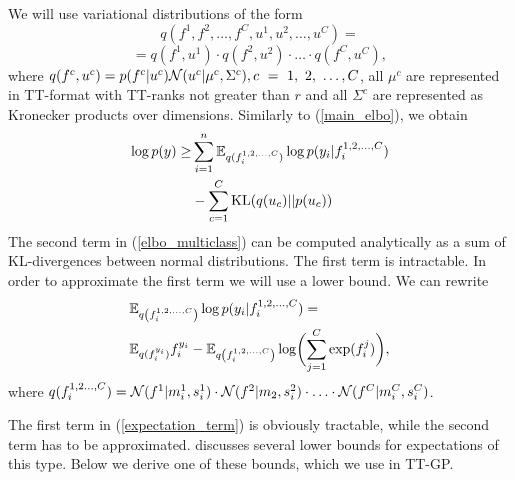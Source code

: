  We will use variational distributions of the form
  \[
    q(f^1, f^2, \ldots, f^C, u^1, u^2, \ldots, u^C) =
  \]
  \[
    = q(f^1, u^1) \cdot q(f^2, u^2) \cdot \ldots \cdot q(f^C, u^C),
  \]
  where $q(f^c, u^c) = p(f^c | u^c) \mathcal{N}(u^c | \mu^c, \Sigma^c), c~=~1,~2,~\ldots,\\C$,
  all $\mu^c$ are represented in TT-format with TT-ranks not greater than $r$
  and all  $\Sigma^c$ are represented as Kronecker products over dimensions. 
  Similarly to (\ref{main_elbo}), we obtain
  \begin{equation}
  \label{elbo_multiclass}
  \begin{split}
    \log p(y) \ge & \sum_{i = 1}^n \mathbb{E}_{q(f_i^{1, 2, \ldots, C})} \log p(y_i | f_i^{1, 2, \ldots, C})
    \\
    & - \sum_{c = 1}^{C} \mbox{KL}(q(u_c) || p(u_c))
  \end{split}
  \end{equation}
  The second term in (\ref{elbo_multiclass}) can be computed analytically as
  a sum of KL-divergences between normal distributions. The first term is
  intractable. In order to approximate the first term we will use a lower bound.
  We can rewrite
  \begin{equation}
  \label{expectation_term}
  \begin{split}
    &\mathbb{E}_{q\left(f_i^{1, 2, \ldots, C}\right)} \log p(y_i | f_i^{1, 2, \ldots, C}) =\\
    &\mathbb{E}_{q(f_i^{y_i})} f_i^{y_i} - \mathbb{E}_{q\left(f_i^{1, 2, \ldots, C}\right)}
    \log \biggl(\sum_{j=1}^C \exp (f_i^j) \biggr),
  \end{split}
  \end{equation}
  where $q(f_i^{1, 2\ldots, C}) = \mathcal{N}(f^1 | m_i^1, s_i^1)\cdot \mathcal{N}(f^2| m_2, s_i^2) \cdot \ldots \cdot \mathcal{N}(f^C | m_i^C, s_i^C)$.

  The first term in (\ref{expectation_term}) is obviously tractable, while the
  second term has to be approximated. \citet{bouchard2007} discusses several
  lower bounds for expectations of this type. Below we derive one of these bounds,
  which we use in TT-GP.

